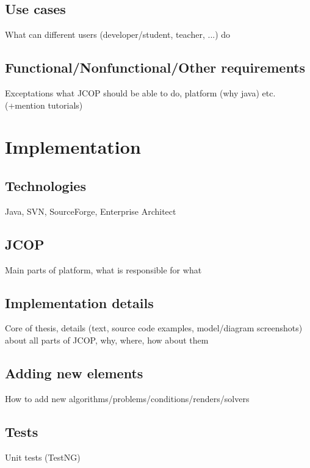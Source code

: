 \documentclass[]{article}
\begin{document}
\subsection{Use cases}

What can different users (developer/student, teacher, ...) do

\subsection{Functional/Nonfunctional/Other requirements}

Exceptations what JCOP should be able to do, platform (why java) etc. (+mention tutorials)

\section{Implementation}

\subsection{Technologies}

Java, SVN, SourceForge, Enterprise Architect

\subsection{JCOP}

Main parts of platform, what is responsible for what

\subsection{Implementation details}

Core of thesis, details (text, source code examples, model/diagram screenshots) about all parts of JCOP, why, where, how about them

\subsection{Adding new elements}
\label{sec:adding-new-elements}

How to add new algorithms/problems/conditions/renders/solvers

\subsection{Tests}

Unit tests (TestNG)
\end{document}
